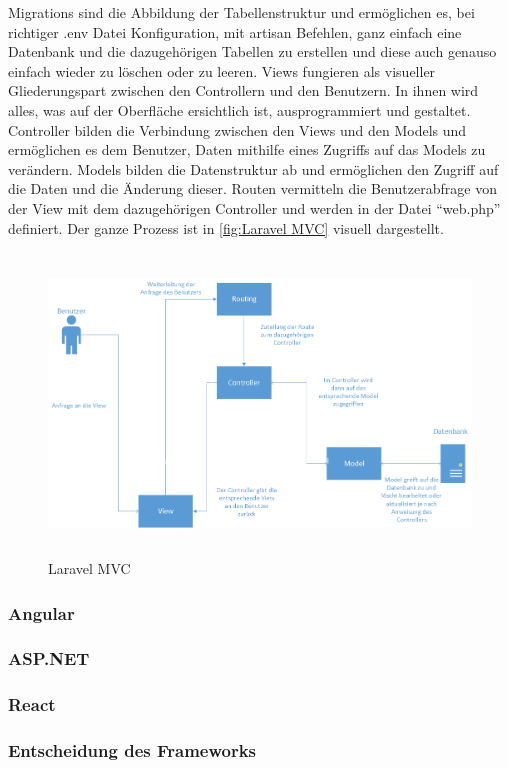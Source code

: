 Migrations sind die Abbildung der Tabellenstruktur und ermöglichen es, bei richtiger .env Datei Konfiguration, mit artisan Befehlen, ganz einfach eine Datenbank und die dazugehörigen Tabellen zu erstellen und diese auch genauso einfach wieder zu löschen oder zu leeren. Views fungieren als visueller Gliederungspart zwischen den Controllern und den Benutzern. In ihnen wird alles, was auf der Oberfläche ersichtlich ist, ausprogrammiert und gestaltet. Controller bilden die Verbindung zwischen den Views und den Models und ermöglichen es dem Benutzer, Daten mithilfe eines Zugriffs auf das Models zu verändern. Models bilden die Datenstruktur ab und ermöglichen den Zugriff auf die Daten und die Änderung dieser. Routen vermitteln die Benutzerabfrage von der View mit dem dazugehörigen Controller und werden in der Datei “web.php” definiert. Der ganze Prozess ist in \autoref{fig:Laravel MVC} visuell dargestellt. 
\begin{figure}[h]
	\centering
	\includegraphics[height=8cm,width=15cm]{images/LaravelMVC}
	\caption{Laravel MVC}
	\label{fig:Laravel MVC}
\end{figure}
\subsubsection{Angular}
\subsubsection{ASP.NET}
\subsubsection{React}
\subsubsection{Entscheidung des Frameworks}\label{sec:Entscheidung des Frameworks}


